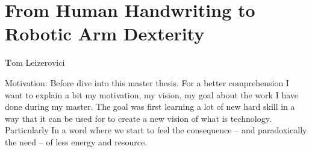 \vspace{3cm}
\chapter*{\centering \Huge From Human Handwriting to
Robotic Arm Dexterity}
{\centering \textbf Tom Leizerovici}

Motivation: Before dive into this master thesis. For a better comprehension I want to explain a bit my motivation, my vision, my goal about the work I have done during my master. The goal was first learning a lot of new hard skill in a way that it can be used for to create a new vision of what is technology. Particularly In a word where we start to feel the consequence -- and paradoxically the need -- of less energy and resource. 



\pagebreak